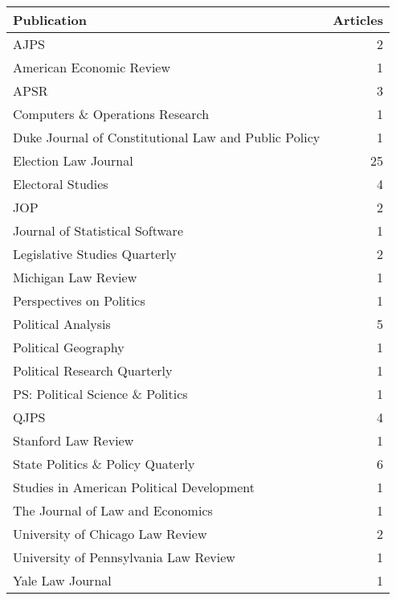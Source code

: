 \documentclass{cup-pan}
\begin{document}
\begin{tabular}{l|r}
\hline
{\bf Publication} & {\bf Articles}\\
\hline
AJPS & 2\\
\hline
American Economic Review & 1\\
\hline
APSR & 3\\
\hline
Computers \& Operations Research & 1\\
\hline
Duke Journal of Constitutional Law and Public Policy & 1\\
\hline
Election Law Journal & 25\\
\hline
Electoral Studies & 4\\
\hline
JOP & 2\\
\hline
Journal of Statistical Software & 1\\
\hline
Legislative Studies Quarterly & 2\\
\hline
Michigan Law Review & 1\\
\hline
Perspectives on Politics & 1\\
\hline
Political Analysis & 5\\
\hline
Political Geography & 1\\
\hline
Political Research Quarterly & 1\\
\hline
PS: Political Science \& Politics & 1\\
\hline
QJPS & 4\\
\hline
Stanford Law Review & 1\\
\hline
State Politics \& Policy Quaterly & 6\\
\hline
Studies in American Political Development & 1\\
\hline
The Journal of Law and Economics & 1\\
\hline
University of Chicago Law Review & 2\\
\hline
University of Pennsylvania Law Review & 1\\
\hline
Yale Law Journal & 1\\
\hline
\end{tabular}
\end{document}
